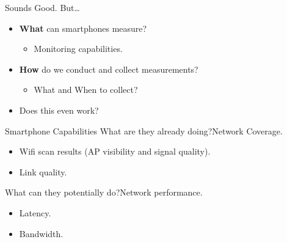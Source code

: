 \begin{frame}{Sounds Good. But\ldots}
  \Large
  \begin{itemize}
    \item \textbf{What} can smartphones measure?
      \begin{itemize}
        \item Monitoring capabilities.
      \end{itemize}
    \item \textbf{How} do we conduct and collect measurements?
      \begin{itemize}
        \item What and When to collect?
      \end{itemize}
    \item \Huge Does this even work?
  \end{itemize}
\end{frame}

\begin{frame}{Smartphone Capabilities}
    What are they already doing?\textendash Network Coverage.
    \begin{itemize}
      \item Wifi scan results (AP visibility and signal quality).
      \item Link quality.
    \end{itemize}
    What can they potentially do?\textendash Network performance.
    \begin{itemize}
      \item Latency.
      \item Bandwidth.
    \end{itemize}
\end{frame}

